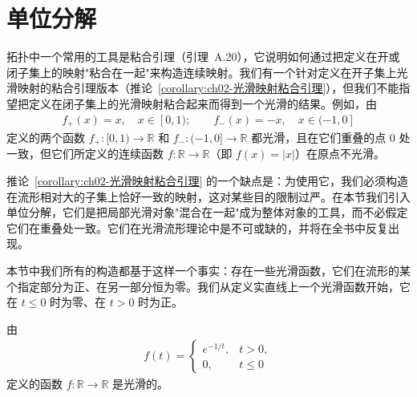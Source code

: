 \documentclass[../../main.tex]{subfiles}
\begin{document}
\section{单位分解}\label{section:ch02-单位分解}

拓扑中一个常用的工具是粘合引理（引理~A.20），它说明如何通过把定义在开或闭子集上的映射"粘合在一起"来构造连续映射。我们有一个针对定义在开子集上光滑映射的粘合引理版本（推论~\cref{corollary:ch02-光滑映射粘合引理}），但我们不能指望把定义在闭子集上的光滑映射粘合起来而得到一个光滑的结果。例如，由
\begin{align*}
f_{+}(x)=x,\quad x\in[0,1);\qquad f_{-}(x)=-x,\quad x\in(-1,0]
\end{align*}
定义的两个函数 $f_{+}:[0,1)\to\mathbb{R}$ 和 $f_{-}:(-1,0]\to\mathbb{R}$ 都光滑，且在它们重叠的点 $0$ 处一致，但它们所定义的连续函数 $f:\mathbb{R}\to\mathbb{R}$（即 $f(x)=|x|$）在原点不光滑。

推论~\cref{corollary:ch02-光滑映射粘合引理} 的一个缺点是：为使用它，我们必须构造在流形相对大的子集上恰好一致的映射，这对某些目的限制过严。在本节我们引入单位分解，它们是把局部光滑对象"混合在一起"成为整体对象的工具，而不必假定它们在重叠处一致。它们在光滑流形理论中是不可或缺的，并将在全书中反复出现。

本节中我们所有的构造都基于这样一个事实：存在一些光滑函数，它们在流形的某个指定部分为正、在另一部分恒为零。我们从定义实直线上一个光滑函数开始，它在 $t\leqslant 0$ 时为零、在 $t>0$ 时为正。

\begin{lemma}\label{lemma:ch02-指数光滑}
由
\begin{align*}
f(t)=
\begin{cases}
e^{-1/t}, & t>0,\\
0, & t\leqslant 0
\end{cases}
\end{align*}
定义的函数 $f:\mathbb{R}\to\mathbb{R}$ 是光滑的。
\end{lemma}
\end{document}
